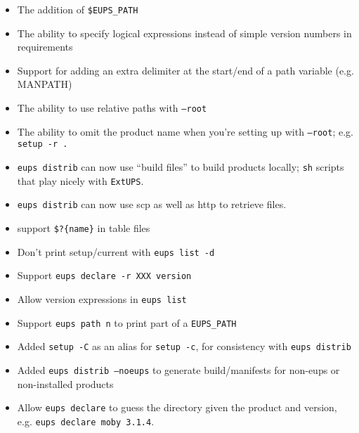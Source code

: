 \documentclass{article}
\newcommand{\code}[1]{\texttt{#1}}
\newcommand{\eups}{\code{ExtUPS}}
\begin{document}
\begin{itemize}
  \item
    The addition of \code{\$EUPS\_PATH}

  \item
    The ability to specify logical expressions instead
    of simple version numbers in requirements

  \item
    Support for adding an extra delimiter at the
    start/end of a path variable (e.g. MANPATH)

  \item
    The ability to use relative paths with \code{--root}

  \item
    The ability to omit the product name when you're
    setting up with \code{--root}; e.g. \code{setup -r .}

  \item
    \code{eups distrib} can now use ``build files'' to
    build products locally; \code{sh} scripts that
    play nicely with \eups{}.

  \item
    \code{eups distrib} can now use scp as well as http to
    retrieve files.

  \item
    support \code{\$?\{name\}} in table files

  \item
    Don't print setup/current with \code{eups list -d}


  \item
    Support \code{eups declare -r XXX version}

  \item
    Allow version expressions in \code{eups list}

  \item
    Support \code{eups path n} to print part of a \code{EUPS\_PATH}

  \item
    Added \code{setup -C} as an alias for \code{setup -c}, for consistency with \code{eups distrib}


  \item
    Added \code{eups distrib --noeups} to generate build/manifests for non-eups or non-installed products

  \item
    Allow \code{eups declare} to guess the directory given the product and version,
    e.g. \code{eups declare moby 3.1.4}.


\end{itemize}
\end{document}
